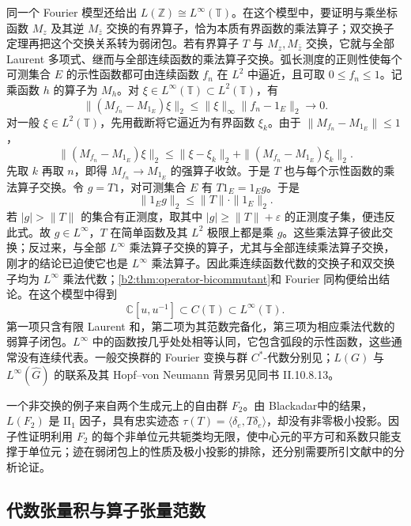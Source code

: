 同一个 Fourier 模型还给出 \(L(\mathbb Z)\cong L^\infty(\mathbb T)\)。在这个模型中，要证明与乘坐标函数 \(M_z\) 及其逆 \(M_{\bar z}\) 交换的有界算子，恰为本质有界函数的乘法算子；双交换子定理再把这个交换关系转为弱闭包。若有界算子 \(T\) 与 \(M_z,M_{\bar z}\) 交换，它就与全部 Laurent 多项式、继而与全部连续函数的乘法算子交换。弧长测度的正则性使每个可测集合 \(E\) 的示性函数都可由连续函数 \(f_n\) 在 \(L^2\) 中逼近，且可取 \(0\le f_n\le1\)。记乘函数 \(h\) 的算子为 \(M_h\)。对 \(\xi\in L^\infty(\mathbb T)\subset L^2(\mathbb T)\)，有
\[
	\|(M_{f_n}-M_{1_E})\xi\|_2 \le\|\xi\|_\infty\|f_n-1_E\|_2\longrightarrow0.
\]
对一般 \(\xi\in L^2(\mathbb T)\)，先用截断将它逼近为有界函数 \(\xi_k\)。由于 \(\|M_{f_n}-M_{1_E}\|\le1\)，
\[
	\|(M_{f_n}-M_{1_E})\xi\|_2 \le\|\xi-\xi_k\|_2 +\|(M_{f_n}-M_{1_E})\xi_k\|_2.
\]
先取 \(k\) 再取 \(n\)，即得 \(M_{f_n}\to M_{1_E}\) 的强算子收敛。于是 \(T\) 也与每个示性函数的乘法算子交换。令 \(g=T1\)，对可测集合 \(E\) 有 \(T1_E=1_Eg\)。于是
\[
	\|1_Eg\|_2\le\|T\|\cdot\|1_E\|_2.
\]
若 \(|g|>\|T\|\) 的集合有正测度，取其中 \(|g|\ge\|T\|+\varepsilon\) 的正测度子集，便违反此式。故 \(g\in L^\infty\)，\(T\) 在简单函数及其 \(L^2\) 极限上都是乘 \(g\)。这些乘法算子彼此交换；反过来，与全部 \(L^\infty\) 乘法算子交换的算子，尤其与全部连续乘法算子交换，刚才的结论已迫使它也是 \(L^\infty\) 乘法算子。因此乘连续函数代数的交换子和双交换子均为 \(L^\infty\) 乘法代数；\cref{b2:thm:operator-bicommutant}和 Fourier 同构便给出结论。在这个模型中得到
\[
	\mathbb C[u,u^{-1}]\subset C(\mathbb T)\subset L^\infty(\mathbb T).
\]
第一项只含有限 Laurent 和，第二项为其范数完备化，第三项为相应乘法代数的弱算子闭包。\(L^\infty\) 中的函数按几乎处处相等认同，它包含弧段的示性函数，这些通常没有连续代表。一般交换群的 Fourier 变换与群 \(C^*\)-代数分别见\cite[Theorem II.10.1.15; Proposition II.10.2.7]{Blackadar2017OperatorAlgebrasCorrected}；\(L(G)\) 与 \(L^\infty(\widehat G)\) 的联系及其 Hopf--von Neumann 背景另见同书 II.10.8.13。

\ProseParagraphBreak
一个非交换的例子来自两个生成元上的自由群 \(F_2\)。由 Blackadar\cite[\nopp III.3.3.2--III.3.3.7]{Blackadar2017OperatorAlgebrasCorrected}中的结果，\(L(F_2)\) 是 \(\mathrm{II}_1\) 因子，具有忠实迹态 \(\tau(T)=\langle\delta_e,T\delta_e\rangle\)，却没有非零极小投影。因子性证明利用 \(F_2\) 的每个非单位元共轭类均无限，使中心元的平方可和系数只能支撑于单位元；迹在弱闭包上的性质及极小投影的排除，还分别需要所引文献中的分析论证。

\subsection{代数张量积与算子张量范数}
\label{b2:subsec:D05:02}


